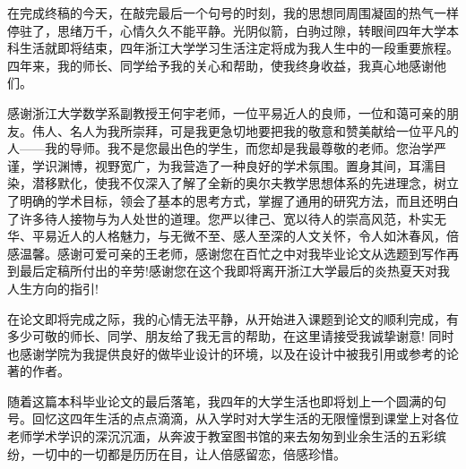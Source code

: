 \begin{thanks}
在完成终稿的今天，在敲完最后一个句号的时刻，我的思想同周围凝固的热气一样停驻了，思绪万千，心情久久不能平静。光阴似箭，白驹过隙，转眼间四年大学本科生活就即将结束，四年浙江大学学习生活注定将成为我人生中的一段重要旅程。四年来，我的师长、同学给予我的关心和帮助，使我终身收益，我真心地感谢他们。

感谢浙江大学数学系副教授王何宇老师，一位平易近人的良师，一位和蔼可亲的朋友。伟人、名人为我所崇拜，可是我更急切地要把我的敬意和赞美献给一位平凡的人——我的导师。我不是您最出色的学生，而您却是我最尊敬的老师。您治学严谨，学识渊博，视野宽广，为我营造了一种良好的学术氛围。置身其间，耳濡目染，潜移默化，使我不仅深入了解了全新的奥尔夫教学思想体系的先进理念，树立了明确的学术目标，领会了基本的思考方式，掌握了通用的研究方法，而且还明白了许多待人接物与为人处世的道理。您严以律己、宽以待人的崇高风范，朴实无华、平易近人的人格魅力，与无微不至、感人至深的人文关怀，令人如沐春风，倍感温馨。感谢可爱可亲的王老师，感谢您在百忙之中对我毕业论文从选题到写作再到最后定稿所付出的辛劳!感谢您在这个我即将离开浙江大学最后的炎热夏天对我人生方向的指引!

在论文即将完成之际，我的心情无法平静，从开始进入课题到论文的顺利完成，有多少可敬的师长、同学、朋友给了我无言的帮助，在这里请接受我诚挚谢意! 同时也感谢学院为我提供良好的做毕业设计的环境，以及在设计中被我引用或参考的论著的作者。

随着这篇本科毕业论文的最后落笔，我四年的大学生活也即将划上一个圆满的句号。回忆这四年生活的点点滴滴，从入学时对大学生活的无限憧憬到课堂上对各位老师学术学识的深沉沉湎，从奔波于教室图书馆的来去匆匆到业余生活的五彩缤纷，一切中的一切都是历历在目，让人倍感留恋，倍感珍惜。
\end{thanks}
